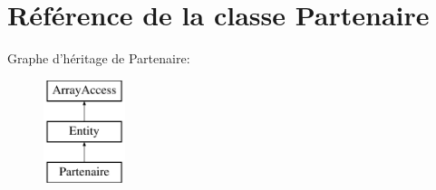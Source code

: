 \hypertarget{class_library_1_1_entities_1_1_partenaire}{\section{Référence de la classe Partenaire}
\label{class_library_1_1_entities_1_1_partenaire}
}
Graphe d'héritage de Partenaire\+:\begin{figure}[H]
\begin{center}
\leavevmode
\includegraphics[height=3.000000cm]{class_library_1_1_entities_1_1_partenaire}
\end{center}
\end{figure}

